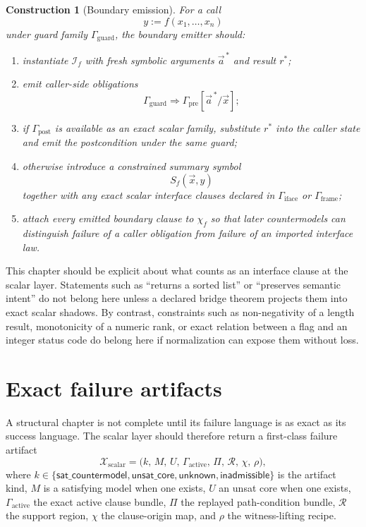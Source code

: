 \documentclass[11pt]{report}
\newtheorem{construction}[definition]{Construction}
\begin{document}
\begin{construction}[Boundary emission]
For a call
\[
y := f(x_1,\dots,x_n)
\]
under guard family $\Gamma_{\mathrm{guard}}$, the boundary emitter should:
\begin{enumerate}
\item instantiate $\mathcal{I}_f$ with fresh symbolic arguments $\vec{a}^{\,*}$ and result $r^{*}$;
\item emit caller-side obligations
\[
\Gamma_{\mathrm{guard}} \Rightarrow \Gamma_{\mathrm{pre}}[\vec{a}^{\,*}/\vec{x}];
\]
\item if $\Gamma_{\mathrm{post}}$ is available as an exact scalar family, substitute $r^{*}$ into the caller state and emit the postcondition under the same guard;
\item otherwise introduce a constrained summary symbol
\[
S_f(\vec{x},y)
\]
together with any exact scalar interface clauses declared in $\Gamma_{\mathrm{iface}}$ or $\Gamma_{\mathrm{frame}}$;
\item attach every emitted boundary clause to $\chi_f$ so that later countermodels can distinguish failure of a caller obligation from failure of an imported interface law.
\end{enumerate}
\end{construction}

This chapter should be explicit about what counts as an interface clause at the scalar layer. Statements such as ``returns a sorted list'' or ``preserves semantic intent'' do not belong here unless a declared bridge theorem projects them into exact scalar shadows. By contrast, constraints such as non-negativity of a length result, monotonicity of a numeric rank, or exact relation between a flag and an integer status code do belong here if normalization can expose them without loss.
\section{Exact failure artifacts}
A structural chapter is not complete until its failure language is as exact as its success language. The scalar layer should therefore return a first-class failure artifact
\[
\mathcal{X}_{\mathrm{scalar}}
=
\bigl(
k,\,
M,\,
U,\,
\Gamma_{\mathrm{active}},\,
\Pi,\,
\mathcal{R},\,
\chi,\,
\rho
\bigr),
\]
where $k \in \{\mathsf{sat\_countermodel},\mathsf{unsat\_core},\mathsf{unknown},\mathsf{inadmissible}\}$ is the artifact kind, $M$ is a satisfying model when one exists, $U$ an unsat core when one exists, $\Gamma_{\mathrm{active}}$ the exact active clause bundle, $\Pi$ the replayed path-condition bundle, $\mathcal{R}$ the support region, $\chi$ the clause-origin map, and $\rho$ the witness-lifting recipe.
\end{document}
